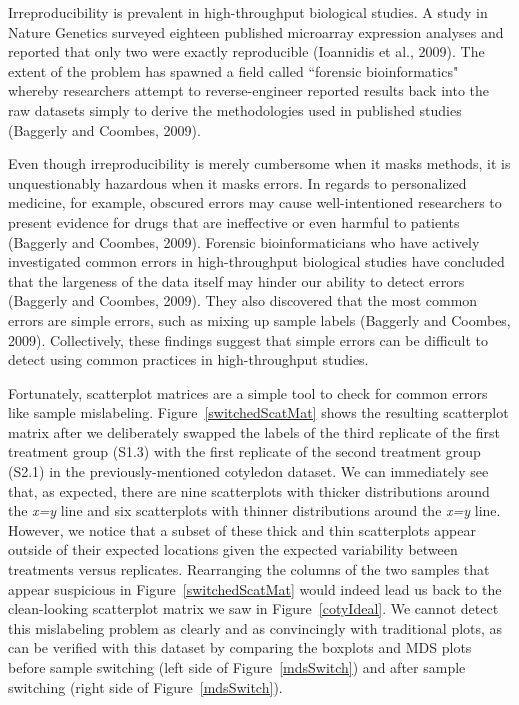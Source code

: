 \documentclass[useAMS,referee]{biom}
\begin{document}
Irreproducibility is prevalent in high-throughput biological studies. A study in Nature Genetics surveyed eighteen published microarray expression analyses and reported that only two were exactly reproducible (Ioannidis et al., 2009). The extent of the problem has spawned a field called ``forensic bioinformatics" whereby researchers attempt to reverse-engineer reported results back into the raw datasets simply to derive the methodologies used in published studies (Baggerly and Coombes, 2009).

Even though irreproducibility is merely cumbersome when it masks methods, it is unquestionably hazardous when it masks errors. In regards to personalized medicine, for example, obscured errors may cause well-intentioned researchers to present evidence for drugs that are ineffective or even harmful to patients (Baggerly and Coombes, 2009). Forensic bioinformaticians who have actively investigated common errors in high-throughput biological studies have concluded that the largeness of the data itself may hinder our ability to detect errors (Baggerly and Coombes, 2009). They also discovered that the most common errors are simple errors, such as mixing up sample labels (Baggerly and Coombes, 2009). Collectively, these findings suggest that simple errors can be difficult to detect using common practices in high-throughput studies.

Fortunately, scatterplot matrices are a simple tool to check for common errors like sample mislabeling. Figure~\ref{switchedScatMat} shows the resulting scatterplot matrix after we deliberately swapped the labels of the third replicate of the first treatment group (S1.3) with the first replicate of the second treatment group (S2.1) in the previously-mentioned cotyledon dataset. We can immediately see that, as expected, there are nine scatterplots with thicker distributions around the \textit{x=y} line and six scatterplots with thinner distributions around the \textit{x=y} line. However, we notice that a subset of these thick and thin scatterplots appear outside of their expected locations given the expected variability between treatments versus replicates. Rearranging the columns of the two samples that appear suspicious in Figure~\ref{switchedScatMat} would indeed lead us back to the clean-looking scatterplot matrix we saw in Figure~\ref{cotyIdeal}. We cannot detect this mislabeling problem as clearly and as convincingly with traditional plots, as can be verified with this dataset by comparing the boxplots and MDS plots before sample switching (left side of Figure~\ref{mdsSwitch}) and after sample switching (right side of Figure~\ref{mdsSwitch}). 
\end{document}
